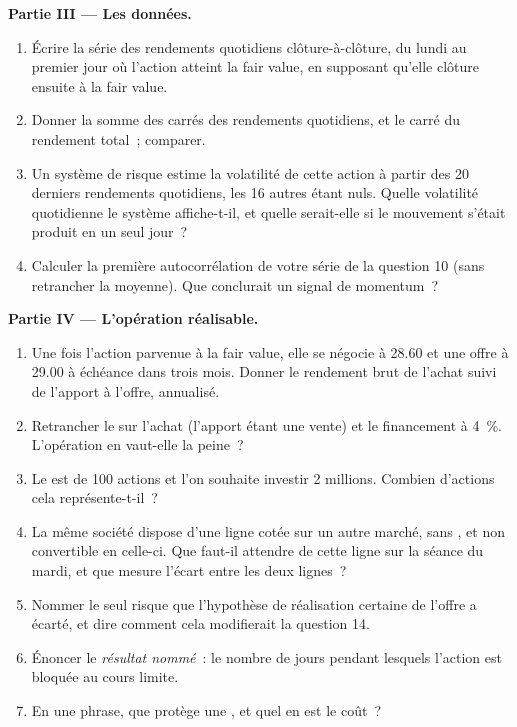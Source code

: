 \begin{problem}
\medskip\noindent\textbf{Partie III --- Les données.}
\begin{enumerate}[resume]
\item Écrire la série des rendements quotidiens clôture-à-clôture, du lundi au
premier jour où l'action atteint la fair value, en supposant qu'elle clôture ensuite à la fair value.
\item Donner la somme des carrés des rendements quotidiens, et le carré du
rendement total~; comparer.
\item Un système de risque estime la volatilité de cette action à partir des 20 derniers
rendements quotidiens, les 16 autres étant nuls. Quelle volatilité quotidienne
le système affiche-t-il, et quelle serait-elle si le mouvement s'était produit en un seul jour~?
\item Calculer la première autocorrélation de votre série de la question 10
(sans retrancher la moyenne). Que conclurait un signal de momentum~?
\end{enumerate}

\medskip\noindent\textbf{Partie IV --- L'opération réalisable.}
\begin{enumerate}[resume]
\item Une fois l'action parvenue à la fair value, elle se négocie à 28.60 et une offre
à 29.00 à échéance dans trois mois. Donner le rendement brut de l'achat suivi de l'apport à l'offre,
annualisé.
\item Retrancher le  sur l'achat (l'apport étant une vente) et le
financement à 4~\%. L'opération en vaut-elle la peine~?
\item Le  est de 100 actions et l'on souhaite investir 2 millions. Combien
d'actions cela représente-t-il~?
\item La même société dispose d'une ligne cotée sur un autre marché, sans , et non convertible en celle-ci. Que faut-il attendre de cette ligne
sur la séance du mardi, et que mesure l'écart entre les deux lignes~?
\item Nommer le seul risque que l'hypothèse de réalisation certaine de l'offre a écarté, et
dire comment cela modifierait la question 14.
\item Énoncer le \emph{résultat nommé}~: le nombre de jours pendant lesquels l'action est bloquée
au cours limite.
\item En une phrase, que protège une , et
quel en est le coût~?
\end{enumerate}
\end{problem}

